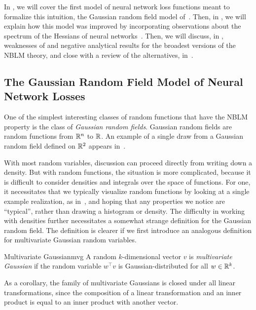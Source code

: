 \documentclass[../../thesis.tex]{subfiles}
\begin{document}
In ,
we will cover the first model of neural network loss functions
meant to formalize this intuition,
the Gaussian random field model of~\cite{dauphin2014}.
Then, in ,
we will explain how this model was improved
by incorporating observations about the spectrum
of the Hessians of neural networks~\cite{pennington2017}.
Then, we will discuss, in ,
weaknesses of and negative analytical results for
the broadest versions of the NBLM theory,
and close with a review of the alternatives,
in~.

\subsection{The Gaussian Random Field Model of Neural Network Losses}

One of the simplest interesting classes of random functions
that have the NBLM property is the class of
\emph{Gaussian random fields}.
Gaussian random fields are random functions
from $\mathbb{R}^n$ to $\mathbb{R}$.
An example of a single draw from a Gaussian random field defined on $\mathbb{R}^2$
appears in~.

With most random variables,
discussion can proceed directly from writing down a density.
But with random functions,
the situation is more complicated,
because it is difficult to consider densities and integrals over
the space of functions.
For one, it necessitates that we typically visualize random functions
by looking at a single example realization,
as in~,
and hoping that any properties we notice are \enquote{typical},
rather than drawing a histogram or density.
The difficulty in working with densities
further necessitates a somewhat strange definition for the Gaussian random field.
The definition is clearer if we first introduce an analogous definition
for multivariate Gaussian random variables.

\begin{definition}{Multivariate Gaussian}{mvg}
	A random $k$-dimensional vector $v$ is \emph{multivariate Gaussian} if
	the random variable $w^\top v$ is Gaussian-distributed
	for all $w\in\mathbb{R}^k$.
\end{definition}
\noindent As a corollary,
the family of multivariate Gaussians is closed under all linear transformations,
since the composition of a linear transformation and an inner product
is equal to an inner product with another vector.
\end{document}
